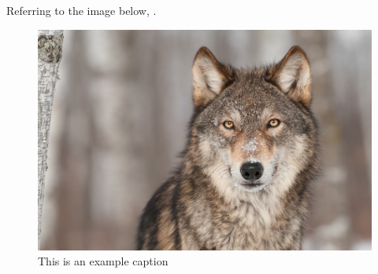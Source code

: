 Referring to the image below, .


\begin{figure}
 \centering
 \includegraphics[width=0.5\columnwidth]{figs/example_picture.jpg}
 \caption{This is an example caption}
 \label{fig:example_figure}
\end{figure}


